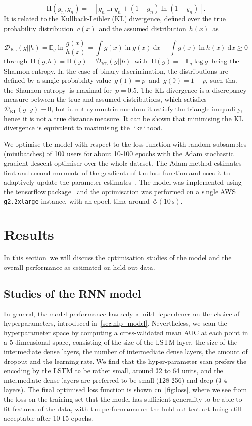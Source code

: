 $$\mathrm{H}(y_n, g_n) = -[g_n \ln{y_n} + (1 - g_n)\ln{(1 - y_n)}].$$
It is related to the Kullback-Leibler (KL) divergence, defined over the true probability distribution~$g(x)$~and the assumed distribution~$h(x)$~as

\begin{equation}
\mathcal{D}_{\mathrm{KL}}(g||h) = \mathbb{E}_g \ln{\frac{g(x)}{h(x)}} = \int g(x) \ln{g(x)}\ \mathrm{d}x - \int g(x) \ln{h(x)}\ \mathrm{d}x \geq 0
\end{equation}
through~$\mathrm{H}(g,h) = \mathrm{H}(g) - \mathcal{D}_{\mathrm{KL}}(g||h)$~with~$\mathrm{H}(g) = -\mathbb{E}_g \log{g}$~being the Shannon entropy. In the case of binary discrimination, the distributions are defined by a single probability value~$g(1) = p$~and~$g(0) = 1 - p$, such that the Shannon entropy is maximal for~$p=0.5$. The KL divergence is a discrepancy measure between the true and assumed distributions, which satisfies~$\mathcal{D}_{\mathrm{KL}}(g||g) = 0$, but is not symmetric nor does it satisfy the triangle inequality, hence it is not a true distance measure. It can be shown that minimising the KL divergence is equivalent to maximising the likelihood.

We optimise the model with respect to the loss function with random subsamples (minibatches) of 100 users for about 10-100 epochs with the Adam stochastic gradient descent optimiser over the whole dataset. The Adam method estimates first and second moments of the gradients of the loss function and uses it to adaptively update the parameter estimates~\cite{DBLP:journals/corr/KingmaB14}. The model was implemented using the tensorflow package~\cite{2016arXiv160304467A} and the optimisation was performed on a single AWS \texttt{g2.2xlarge} instance, with an epoch time around~$\mathcal{O}(10~\mathrm{s})$.

\section{Results}
In this section, we will discuss the optimisation studies of the model and the overall performance as estimated on held-out data.

\subsection{Studies of the RNN model}
In general, the model performance has only a mild dependence on the choice of hyperparameters, introduced in~\cref{sec:nlp_model}. Nevertheless, we scan the hyperparameter space by computing a cross-validated mean AUC at each point in a 5-dimensional space, consisting of the size of the LSTM layer, the size of the intermediate dense layers, the number of intermediate dense layers, the amount of dropout and the learning rate. We find that the hyper-parameter scan prefers the encoding by the LSTM to be rather small, around 32 to 64 units, and the intermediate dense layers are preferred to be small (128-256) and deep (3-4 layers). The final optimised loss function is shown on~\cref{fig:loss}, where we see from the loss on the training set that the model has sufficient generality to be able to fit features of the data, with the performance on the held-out test set being still acceptable after 10-15 epochs.

